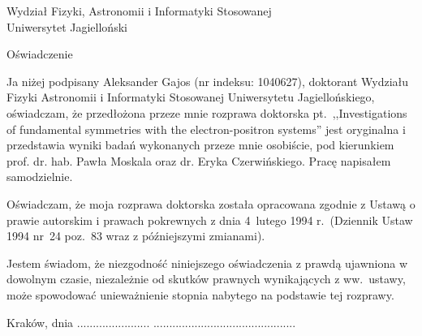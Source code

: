 \cleardoublepage %
\thispagestyle{plain}
\begingroup
{}

Wydział Fizyki, Astronomii i Informatyki Stosowanej\\
Uniwersytet Jagielloński\\

\vspace{2cm}

\begin{center}
  \LARGE Oświadczenie
\end{center}
\par
\vspace{3ex}
{\setlength{\parindent}{4ex}
Ja niżej podpisany Aleksander Gajos (nr indeksu: 1040627), doktorant Wydziału Fizyki Astronomii i Informatyki Stosowanej Uniwersytetu Jagiellońskiego, oświadczam, że przedłożona przeze mnie rozprawa doktorska pt.\ ,,Investigations of fundamental symmetries with the electron-positron systems'' jest oryginalna i przedstawia wyniki badań wykonanych przeze mnie osobiście, pod kierunkiem prof. dr. hab. Pawła Moskala oraz dr. Eryka Czerwińskiego. Pracę napisałem samodzielnie.

Oświadczam, że moja rozprawa doktorska została opracowana zgodnie z Ustawą o prawie autorskim i prawach pokrewnych z dnia 4~lutego 1994 r.\ (Dziennik Ustaw 1994 nr~24 poz.~83 wraz z późniejszymi zmianami).

Jestem świadom, że niezgodność niniejszego oświadczenia z prawdą ujawniona w dowolnym czasie, niezależnie od skutków prawnych wynikających z ww.~ustawy, może spowodować unieważnienie stopnia nabytego na podstawie tej rozprawy.
}
\vspace{8ex}

Kraków, dnia ....................... \hfill .............................................

\par
\endgroup
{}
\vfill
